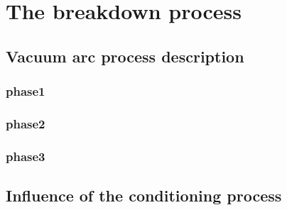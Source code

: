\chapter[The breakdown process]{The breakdown process}

\section[Vacuum arc process description]{Vacuum arc process description}

\subsection[phase1]{phase1}

\subsection[phase2]{phase2}

\subsection[phase3]{phase3}

\section[Influence of the conditioning process]{Influence of the conditioning process}

